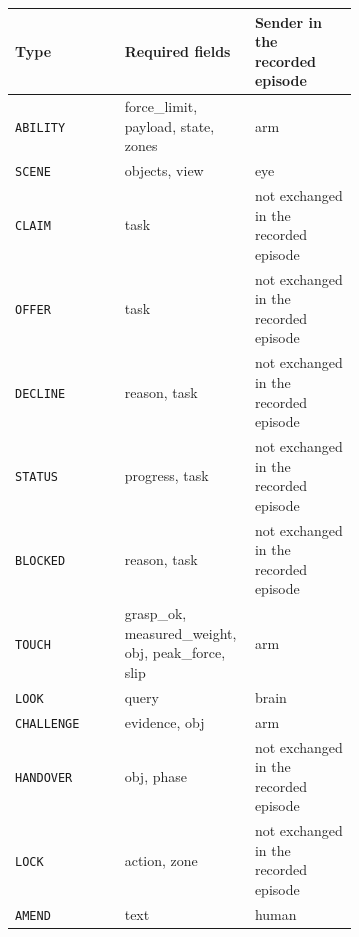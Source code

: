 \begin{tabular}{lp{0.38\linewidth}p{0.3\linewidth}}
\toprule
Type & Required fields & Sender in the recorded episode \\
\midrule
\texttt{ABILITY} & force\_limit, payload, state, zones & arm \\
\texttt{SCENE} & objects, view & eye \\
\texttt{CLAIM} & task & not exchanged in the recorded episode \\
\texttt{OFFER} & task & not exchanged in the recorded episode \\
\texttt{DECLINE} & reason, task & not exchanged in the recorded episode \\
\texttt{STATUS} & progress, task & not exchanged in the recorded episode \\
\texttt{BLOCKED} & reason, task & not exchanged in the recorded episode \\
\texttt{TOUCH} & grasp\_ok, measured\_weight, obj, peak\_force, slip & arm \\
\texttt{LOOK} & query & brain \\
\texttt{CHALLENGE} & evidence, obj & arm \\
\texttt{HANDOVER} & obj, phase & not exchanged in the recorded episode \\
\texttt{LOCK} & action, zone & not exchanged in the recorded episode \\
\texttt{AMEND} & text & human \\
\bottomrule
\end{tabular}
